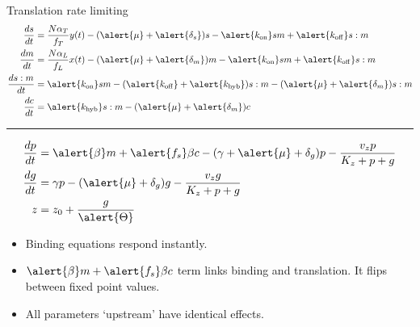\documentclass{beamer}
\begin{document}
\footnotesize
\begin{frame}{Translation rate limiting}
\begin{align*} 
\frac{ds}{dt} &= \frac{N\alpha_{T}}{f_{T}} y(t)-(\alert{\mu} + \alert{\delta_{s}})s -\alert{k_{\mathrm{on}}}sm +\alert{k_{\mathrm{off}}}s:m \\
\frac{dm}{dt} &=  \frac{N\alpha_{L}}{f_{L}}x(t)-(\alert{\mu} + \alert{\delta_{m}})m -\alert{k_{\mathrm{on}}}sm +\alert{k_{\mathrm{off}}}s:m  \\
\frac{ds:m}{dt} & = \alert{k_{\mathrm{on}}}sm  - (\alert{k_{\mathrm{off}}}+ \alert{k_{\mathrm{hyb}}})s:m  -(\alert{\mu} + \alert{\delta_{m}} )s:m \\
\frac{dc}{dt} & = \alert{k_{\mathrm{hyb}}}s:m  -(\alert{\mu} + \alert{\delta_{m}})c  
\end{align*}
\begin{center}
\rule{0.5\textwidth}{.4pt}
\end{center}
\begin{align*} 
\frac{dp}{dt} & = \alert{\beta} m +\alert{f_{s}}\beta c -(\gamma + \alert{\mu} + \delta_{g})p - \frac{v_{z}p}{K_{z}+p+g}   \\
\frac{dg}{dt} & = \gamma p - (\alert{\mu} + \delta_{g})g - \frac{v_{z}g}{K_{z}+p+g} \\
z &= z_{0} +\frac{g}{\alert{\Theta}} 
\end{align*}
\normalsize
\vspace{-5mm}
  \begin{itemize}
  \item Binding equations respond instantly.
    \item $ \alert{\beta} m +\alert{f_{s}}\beta c $ term links binding and translation. It flips between fixed point values.
    \item All parameters `upstream' have identical effects.
\end{itemize}
\end{frame}
\end{document}
